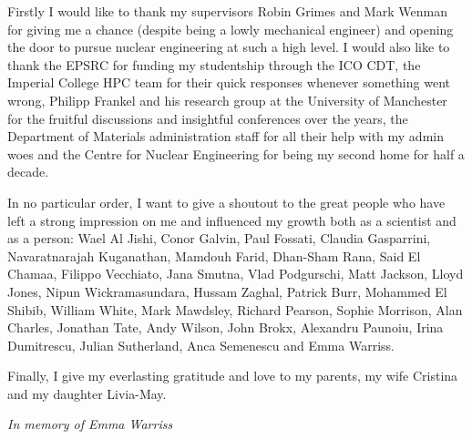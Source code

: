 \cleardoublepage


\begin{acknowledgements}

Firstly I would like to thank my supervisors Robin Grimes and Mark Wenman for giving me a chance (despite being a lowly mechanical engineer) and opening the door to pursue nuclear engineering at such a high level. I would also like to thank the EPSRC for funding my studentship through the ICO CDT, the Imperial College HPC team for their quick responses whenever something went wrong, Philipp Frankel and his research group at the University of Manchester for the fruitful discussions and insightful conferences over the years, the Department of Materials administration staff for all their help with my admin woes and the Centre for Nuclear Engineering for being my second home for half a decade.

In no particular order, I want to give a shoutout to the great people who have left a strong impression on me and influenced my growth both as a scientist and as a person: Wael Al Jishi, Conor Galvin, Paul Fossati, Claudia Gasparrini, Navaratnarajah Kuganathan, Mamdouh Farid, Dhan-Sham Rana, Said El Chamaa, Filippo Vecchiato, Jana Smutna, Vlad Podgurschi, Matt Jackson, Lloyd Jones, Nipun Wickramasundara, Hussam Zaghal, Patrick Burr, Mohammed El Shibib, William White, Mark Mawdsley, Richard Pearson, Sophie Morrison, Alan Charles, Jonathan Tate, Andy Wilson, John Brokx, Alexandru Paunoiu, Irina Dumitrescu, Julian Sutherland, Anca Semenescu and Emma Warriss.

Finally, I give my everlasting gratitude and love to my parents, my wife Cristina and my daughter Livia-May.

\clearpage

\vspace{5cm}
\begin{center}
\emph{In memory of Emma Warriss}
\end{center}

\end{acknowledgements}
